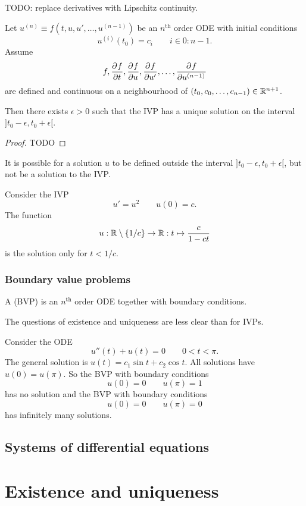 TODO: replace derivatives with Lipschitz continuity.
\begin{theorem}
Let $u^{(n)} \equiv f(t,u,u',\ldots, u^{(n-1)})$ be an $n^{\text{th}}$ order ODE with initial conditions
\[ u^{(i)}(t_0) = c_i \qquad i \in 0:n-1. \]
Assume
\[ f,  \frac{\partial{^{}}f}{\partial{{t}^{}}} ,  \frac{\partial{^{}}f}{\partial{{u}^{}}} ,  \frac{\partial{^{}}f}{\partial{{u'}^{}}} , \ldots,  \frac{\partial{^{}}f}{\partial{{u^{(n-1)}}^{}}}  \]
are defined and continuous on a neighbourhood of $(t_0, c_0, \ldots, c_{n-1})\in \mathbb{R}^{n+1}$.

Then there exists $\epsilon > 0$ such that the IVP has a unique solution on the interval $]t_0-\epsilon, t_0+\epsilon[$.
\end{theorem}
\begin{proof}
TODO
\end{proof}

It is possible for a solution $u$ to be defined outside the interval $]t_0-\epsilon, t_0+\epsilon[$, but not be a solution to the IVP.
\begin{example}
Consider the IVP
\[ u' = u^2 \qquad u(0) = c. \]
The function
\[ u: \mathbb{R}\setminus\{1/c\} \to \mathbb{R}: t\mapsto \frac{c}{1-ct} \]
is the solution only for $t < 1/c$.
\end{example}

\subsubsection{Boundary value problems}
\begin{definition}
A  (BVP) is an $n^{\text{th}}$ order ODE together with boundary conditions.
\end{definition}

The questions of existence and uniqueness are less clear than for IVPs.
\begin{example}
Consider the ODE
\[ u''(t) + u(t) = 0 \qquad 0<t<\pi. \]
The general solution is $u(t) = c_1\sin t + c_2 \cos t$. All solutions have $u(0) = u(\pi)$.
So the BVP with boundary conditions
\[ u(0) = 0 \qquad u(\pi) = 1 \]
has no solution and the BVP with boundary conditions
\[ u(0) = 0 \qquad u(\pi) = 0 \]
has infinitely many solutions.
\end{example}


\subsection{Systems of differential equations}

\section{Existence and uniqueness}
